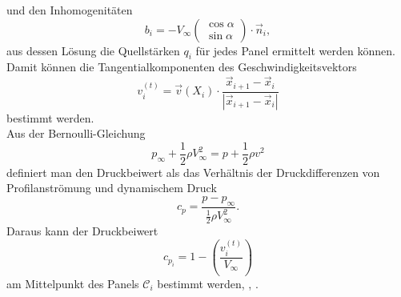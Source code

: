 und den Inhomogenitäten
\begin{equation}
b_i =  -V_{\infty} \left( \begin{matrix} \cos \alpha \\ \sin \alpha \end{matrix} \right) \cdot \vec n_i,
\end{equation}
aus dessen Lösung die Quellstärken $q_i$ für jedes Panel ermittelt werden können. \\
Damit können die Tangentialkomponenten des Geschwindigkeitsvektors
\begin{equation}
\label{eqn:vt}
v_i^{(t)} =  \vec v(X_i) \cdot \frac{\vec x_{i+1}-\vec x_i}{|\vec x_{i+1}-\vec x_i|}
\end{equation}
bestimmt werden. \\
Aus der Bernoulli-Gleichung
\begin{equation}
p_{\infty} + \frac{1}{2} \rho V_{\infty}^2 =  p + \frac{1}{2} \rho v^2
\end{equation}
definiert man den Druckbeiwert als das Verhältnis der Druckdifferenzen von Profilanströmung und dynamischem Druck 
\begin{equation}
c_p =  \frac{p-p_{\infty}}{\frac{1}{2} \rho V_{\infty}^2}.
\end{equation}
Daraus kann der Druckbeiwert
\begin{equation}
c_{p_i} =  1 - \left( \frac{v_i^{(t)}}{V_{\infty}}\right)
\end{equation}
am Mittelpunkt des Panels $\mathcal{C}_i$ bestimmt werden, \cite{Hess:1966}, \cite{Cebeci:1999}.
